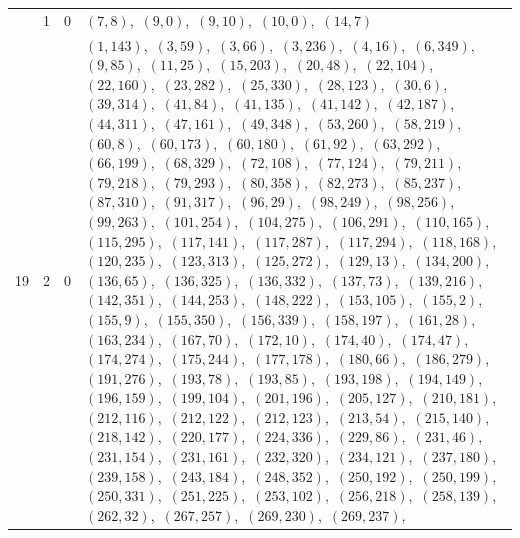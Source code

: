 \documentclass[11pt]{article}
\begin{document}
\begin{longtable}{@{}rrl>{\raggedright\arraybackslash}p{}@{}}
\addlinespace[3pt]
19 & 1 & $0$ & $(7,8)$,\allowbreak\ $(9,0)$,\allowbreak\ $(9,10)$,\allowbreak\ $(10,0)$,\allowbreak\ $(14,7)$\\
19 & 2 & $0$ & $(1,143)$,\allowbreak\ $(3,59)$,\allowbreak\ $(3,66)$,\allowbreak\ $(3,236)$,\allowbreak\ $(4,16)$,\allowbreak\ $(6,349)$,\allowbreak\ $(9,85)$,\allowbreak\ $(11,25)$,\allowbreak\ $(15,203)$,\allowbreak\ $(20,48)$,\allowbreak\ $(22,104)$,\allowbreak\ $(22,160)$,\allowbreak\ $(23,282)$,\allowbreak\ $(25,330)$,\allowbreak\ $(28,123)$,\allowbreak\ $(30,6)$,\allowbreak\ $(39,314)$,\allowbreak\ $(41,84)$,\allowbreak\ $(41,135)$,\allowbreak\ $(41,142)$,\allowbreak\ $(42,187)$,\allowbreak\ $(44,311)$,\allowbreak\ $(47,161)$,\allowbreak\ $(49,348)$,\allowbreak\ $(53,260)$,\allowbreak\ $(58,219)$,\allowbreak\ $(60,8)$,\allowbreak\ $(60,173)$,\allowbreak\ $(60,180)$,\allowbreak\ $(61,92)$,\allowbreak\ $(63,292)$,\allowbreak\ $(66,199)$,\allowbreak\ $(68,329)$,\allowbreak\ $(72,108)$,\allowbreak\ $(77,124)$,\allowbreak\ $(79,211)$,\allowbreak\ $(79,218)$,\allowbreak\ $(79,293)$,\allowbreak\ $(80,358)$,\allowbreak\ $(82,273)$,\allowbreak\ $(85,237)$,\allowbreak\ $(87,310)$,\allowbreak\ $(91,317)$,\allowbreak\ $(96,29)$,\allowbreak\ $(98,249)$,\allowbreak\ $(98,256)$,\allowbreak\ $(99,263)$,\allowbreak\ $(101,254)$,\allowbreak\ $(104,275)$,\allowbreak\ $(106,291)$,\allowbreak\ $(110,165)$,\allowbreak\ $(115,295)$,\allowbreak\ $(117,141)$,\allowbreak\ $(117,287)$,\allowbreak\ $(117,294)$,\allowbreak\ $(118,168)$,\allowbreak\ $(120,235)$,\allowbreak\ $(123,313)$,\allowbreak\ $(125,272)$,\allowbreak\ $(129,13)$,\allowbreak\ $(134,200)$,\allowbreak\ $(136,65)$,\allowbreak\ $(136,325)$,\allowbreak\ $(136,332)$,\allowbreak\ $(137,73)$,\allowbreak\ $(139,216)$,\allowbreak\ $(142,351)$,\allowbreak\ $(144,253)$,\allowbreak\ $(148,222)$,\allowbreak\ $(153,105)$,\allowbreak\ $(155,2)$,\allowbreak\ $(155,9)$,\allowbreak\ $(155,350)$,\allowbreak\ $(156,339)$,\allowbreak\ $(158,197)$,\allowbreak\ $(161,28)$,\allowbreak\ $(163,234)$,\allowbreak\ $(167,70)$,\allowbreak\ $(172,10)$,\allowbreak\ $(174,40)$,\allowbreak\ $(174,47)$,\allowbreak\ $(174,274)$,\allowbreak\ $(175,244)$,\allowbreak\ $(177,178)$,\allowbreak\ $(180,66)$,\allowbreak\ $(186,279)$,\allowbreak\ $(191,276)$,\allowbreak\ $(193,78)$,\allowbreak\ $(193,85)$,\allowbreak\ $(193,198)$,\allowbreak\ $(194,149)$,\allowbreak\ $(196,159)$,\allowbreak\ $(199,104)$,\allowbreak\ $(201,196)$,\allowbreak\ $(205,127)$,\allowbreak\ $(210,181)$,\allowbreak\ $(212,116)$,\allowbreak\ $(212,122)$,\allowbreak\ $(212,123)$,\allowbreak\ $(213,54)$,\allowbreak\ $(215,140)$,\allowbreak\ $(218,142)$,\allowbreak\ $(220,177)$,\allowbreak\ $(224,336)$,\allowbreak\ $(229,86)$,\allowbreak\ $(231,46)$,\allowbreak\ $(231,154)$,\allowbreak\ $(231,161)$,\allowbreak\ $(232,320)$,\allowbreak\ $(234,121)$,\allowbreak\ $(237,180)$,\allowbreak\ $(239,158)$,\allowbreak\ $(243,184)$,\allowbreak\ $(248,352)$,\allowbreak\ $(250,192)$,\allowbreak\ $(250,199)$,\allowbreak\ $(250,331)$,\allowbreak\ $(251,225)$,\allowbreak\ $(253,102)$,\allowbreak\ $(256,218)$,\allowbreak\ $(258,139)$,\allowbreak\ $(262,32)$,\allowbreak\ $(267,257)$,\allowbreak\ $(269,230)$,\allowbreak\ $(269,237)$,\allowbreak\ 
\end{longtable}
\end{document}
